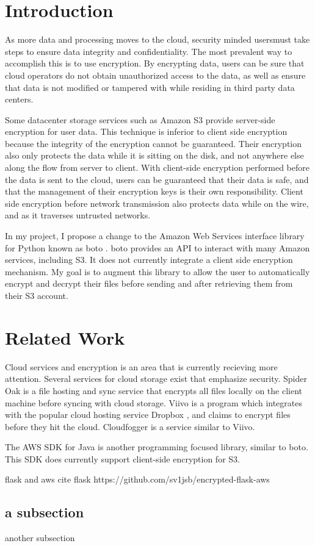 \section{Introduction}
As more data and processing moves to the cloud, security minded usersmust take steps to ensure data integrity and confidentiality.
The most prevalent way to accomplish this is to use encryption. 
By encrypting data, users can be sure that cloud operators do not
obtain unauthorized access to the data, as well as ensure that data is not modified or tampered with while residing in third party data centers.

Some datacenter storage services such as Amazon S3 \cite{amazons3} provide server-side encryption for user data. This technique is inferior to client side encryption because the integrity of the encryption cannot be guaranteed.
Their encryption also only protects the data while it is sitting on the disk, and not anywhere else along the flow from server to client.
With client-side encryption performed before the data is sent to the cloud, users can be guaranteed that their data is safe, and that the management of their encryption keys is their own responsibility. 
Client side encryption before network transmission also protects data while on the wire, and as it traverses untrusted networks.

In my project, I propose a change to the Amazon Web Services interface library for Python known as boto \cite{boto}. boto provides an API to interact with many Amazon services, including S3. It does not currently integrate a client side encryption mechanism. My goal is to augment this library to allow the user to automatically encrypt and decrypt their files before sending and after retrieving them from their S3 account.

\section{Related Work}
Cloud services and encryption is an area that is currently recieving more attention. Several services for cloud storage exist that emphasize security. Spider Oak \cite{spideroak} is a file hosting and sync service that encrypts all files locally on the client machine before syncing with cloud storage. Viivo \cite{viivo} is a program which integrates with the popular cloud hosting service Dropbox \cite{dropbox}, and claims to encrypt files before they hit the cloud. Cloudfogger \cite{cloudfogger} is a service similar to Viivo.

The AWS SDK for Java \cite{aws-sdk-java} is another programming focused library, similar to boto. This SDK does currently support client-side encryption for S3.

flask and aws cite flask
https://github.com/sv1jsb/encrypted-flask-aws


\subsection{a subsection}
another subsection

